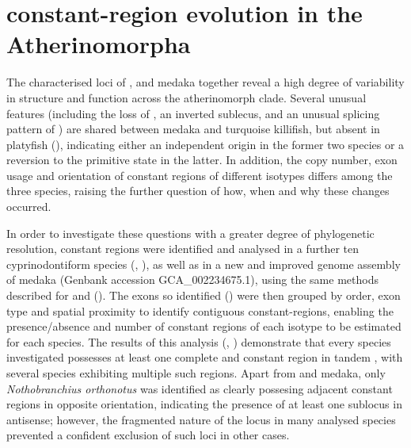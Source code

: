 
\section{\igh{} constant-region evolution in the Atherinomorpha}
\label{sec:comparative}

The characterised \igh{} loci of \nfu, \xma and medaka together reveal a high degree of variability in structure and function across the atherinomorph clade. Several unusual features (including the loss of , an inverted sublecus, and an unusual splicing pattern of ) are shared between medaka and turquoise killifish, but absent in platyfish (), indicating either an independent origin in the former two species or a reversion to the primitive state in the latter. In addition, the copy number, exon usage and orientation of constant regions of different isotypes differs among the three species, raising the further question of how, when and why these changes occurred. 

In order to investigate these questions with a greater degree of phylogenetic resolution, \igh{} constant regions were identified and analysed in a further ten cyprinodontiform species (, ), as well as in a new and improved genome assembly of medaka (Genbank accession GCA\_002234675.1), using the same methods described for \Nfu and \Xma (). The exons so identified () were then grouped by order, exon type and spatial proximity to identify contiguous constant-regions, enabling the presence/absence and number of constant regions of each isotype to be estimated for each species. %
The results of this analysis (, ) demonstrate that every species investigated possesses at least one complete  and  constant region in tandem , with several species exhibiting multiple such regions. Apart from \Nfu and medaka, only \textit{Nothobranchius orthonotus} was identified as clearly possesing adjacent constant regions in opposite orientation, indicating the presence of at least one sublocus in antisense; however, the fragmented nature of the \igh{} locus in many analysed species prevented a confident exclusion of such loci in other cases.



